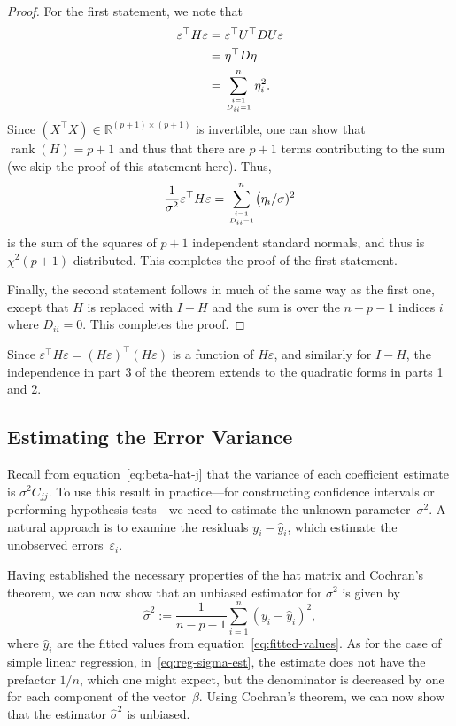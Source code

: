 \documentclass[
  a4paper,
]{article}
\theoremstyle{definition}
\theoremstyle{definition}
\theoremstyle{definition}
\theoremstyle{definition}
\theoremstyle{remark}
\begin{document}
\begin{proof}
For the first statement, we note that
\begin{align*}
  \varepsilon^\top H \varepsilon
  &= \varepsilon^\top U^\top D U \varepsilon\\
  &= \eta^\top D \eta \\
  &= \sum_{i=1 \atop D_{ii}=1}^n \eta_i^2.
\end{align*}
Since \((X^\top X) \in\mathbb{R}^{(p+1)\times (p+1)}\) is invertible, one can show
that \(\mathop{\mathrm{rank}}(H) = p+1\) and thus that there are \(p+1\) terms contributing
to the sum (we skip the proof of this statement here). Thus,
\begin{equation*}
  \frac{1}{\sigma^2} \varepsilon^\top H \varepsilon
  = \sum_{i=1 \atop D_{ii}=1}^n \bigl(\eta_i/\sigma)^2
\end{equation*}
is the sum of the squares of \(p+1\) independent standard normals,
and thus is \(\chi^2(p+1)\)-distributed. This completes the proof of the
first statement.

Finally, the second statement follows in much of the same way as the
first one, except that \(H\) is replaced with \(I-H\) and the sum is
over the \(n - p - 1\) indices \(i\) where \(D_{ii} = 0\).
This completes the proof.
\end{proof}

Since \(\varepsilon^\top H \varepsilon= (H\varepsilon)^\top (H\varepsilon)\) is a function of \(H\varepsilon\),
and similarly for \(I-H\), the independence in part 3 of the theorem extends to
the quadratic forms in parts 1 and 2.

\subsection{Estimating the Error Variance}\label{var-est-bias}

Recall from equation~\eqref{eq:beta-hat-j} that the variance of each
coefficient estimate is \(\sigma^2 C_{jj}\). To use this result in practice---for
constructing confidence intervals or performing hypothesis tests---we need
to estimate the unknown parameter~\(\sigma^2\). A natural approach is to examine
the residuals \(y_i - \hat y_i\), which estimate the unobserved errors~\(\varepsilon_i\).

Having established the necessary properties of the hat matrix and Cochran's
theorem, we can now show that an unbiased estimator for \(\sigma^2\)
is given by
\begin{equation}
  \hat\sigma^2
  := \frac{1}{n-p-1} \sum_{i=1}^n (y_i - \hat y_i)^2, \label{eq:hat-sigma-squared}
\end{equation}
where \(\hat y_i\) are the fitted values from equation~\eqref{eq:fitted-values}.
As for the case of simple linear regression, in~\eqref{eq:reg-sigma-est}, the
estimate does not have the prefactor \(1/n\), which one might expect, but
the denominator is decreased by one for each component of the vector~\(\beta\).
Using Cochran's theorem, we can now show that the estimator \(\hat\sigma^2\) is
unbiased.
\end{document}
